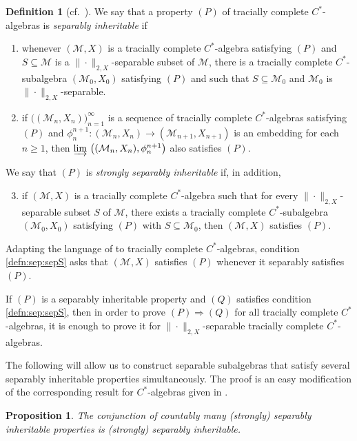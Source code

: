 \documentclass[a4paper,11pt]{amsart}
\newtheorem{proposition}[theorem]{Proposition}
\theoremstyle{definition}
\newtheorem{definition}[theorem]{Definition}
\numberwithin{equation}{section}
\numberwithin{theorem}{section}
\newcommand{\M}{\mathcal{M}}
\begin{document}
\begin{definition}[cf.\ {\cite[Section II.8.5]{Bl06}}]\label{defn:sep}
	We say that a property $(P)$ of tracially complete $C^*$-algebras is \emph{separably inheritable} if
	\begin{enumerate}
		\item\label{defn:sep:unbounded} whenever $(\M, X)$ is a tracially complete $C^*$-algebra satisfying $(P)$ and $S \subseteq \M$ is a $\|\cdot\|_{2, X}$-separable subset of $\M$, there is a tracially complete $C^*$-subalgebra $(\M_0,X_0)$ satisfying $(P)$ and such that $S\subseteq \M_0$ and $\mathcal M_0$ is $\|\cdot\|_{2, X}$-separable.
		\item\label{defn:sep:closed} if $\big((\M_n, X_n)\big)_{n=1}^\infty$ is a sequence of tracially complete $C^*$-algebras satisfying $(P)$ and $\phi_n^{n+1} \colon (\M_n, X_n) \rightarrow (\M_{n+1}, X_{n+1})$ is an embedding for each $n \geq 1$, then $\varinjlim\, \big((\M_n, X_n), \phi_n^{n+1}\big)$ also satisfies $(P)$.
	\end{enumerate}
 We say that $(P)$ is \emph{strongly separably inheritable} if, in addition,
 \begin{enumerate}
     \setcounter{enumi}{2}
     \item\label{defn:sep:sepS} if $(\M,X)$ is a tracially complete $C^*$-algebra such that for every $\|\cdot\|_{2,X}$-separable subset $S$ of $\M$, there exists a tracially complete $C^*$-subalgebra $(\M_0,X_0)$ satisfying $(P)$ with $S \subseteq \mathcal M_0$, then $(\M,X)$ satisfies $(P)$.
 \end{enumerate}
\end{definition}

Adapting the language of \cite[Definition 1.4]{Schaf20} to tracially complete $C^*$-algebras, condition \ref{defn:sep:sepS} asks that $(\M,X)$ satisfies $(P)$ whenever it separably satisfies $(P)$.

If $(P)$ is a separably inheritable property and $(Q)$ satisfies condition \ref{defn:sep:sepS}, then in order to prove $(P)\Rightarrow(Q)$ for all tracially complete $C^*$-algebras, it is enough to prove it for $\|\cdot\|_{2,X}$-separable tracially complete $C^*$-algebras. 

The following will allow us to construct separable subalgebras that satisfy several separably inheritable properties simultaneously.  The proof is an easy modification of the corresponding result for $C^*$-algebras given in \cite[Proposition~II.8.5.3]{Bl06}.

\begin{proposition}\label{prop:sep-countable}
	The conjunction of countably many (strongly) separably inheritable properties is (strongly) separably inheritable.
\end{proposition}
\end{document}
